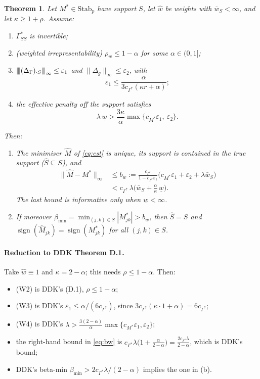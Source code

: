 \documentclass[11pt,a4paper]{article}
\numberwithin{equation}{section}
\theoremstyle{plain}
\newtheorem{theorem}{Theorem}
\theoremstyle{remark}
\newcommand{\opnorm}[1]{{\vert\kern-0.25ex\vert\kern-0.25ex\vert #1 \vert\kern-0.25ex\vert\kern-0.25ex\vert}}
\DeclareMathOperator{\sign}{sign}
\begin{document}
\begin{theorem}\label{thm:W1}
Let $M^*\in\mathrm{Stab}_p$ have support $S$, let $\hat w$ be weights with $\bar w_S<\infty$, and let $\kappa\ge1+\rho$. Assume:
\begin{enumerate}[label=\upshape(W\arabic*),leftmargin=3.2em]
  \item $\Gamma^*_{SS}$ is invertible;
  \item (weighted irrepresentability) $\rho_w\le1-\alpha$ for some $\alpha\in(0,1]$;
  \item $\opnorm{(\Delta_\Gamma)_{\cdot S}}_\infty\le\varepsilon_1$ and $\|\Delta_g\|_\infty\le\varepsilon_2$, with
  \[
  \varepsilon_1\le\frac{\alpha}{3c_{\Gamma^*}(\kappa r+\alpha)};
  \]
  \item the effective penalty off the support satisfies
  \[
  \lambda\,\underline w>\frac{3\kappa}{\alpha}\max\{c_{M^*}\varepsilon_1,\ \varepsilon_2\}.
  \]
\end{enumerate}
Then:
\begin{enumerate}[label=\upshape\textbf{(\alph*)},leftmargin=2.5em]
  \item The minimiser $\hat M$ of \eqref{eq:est} is unique, its support is contained in the true support ($\hat S\subseteq S$), and
  \begin{equation}\label{eq:bw}
  \begin{split}
  \|\hat M-M^*\|_\infty&\le b_w:=\frac{c_{\Gamma^*}}{1-c_{\Gamma^*}\varepsilon_1}\big(c_{M^*}\varepsilon_1+\varepsilon_2+\lambda\bar w_S\big)\\
  &<c_{\Gamma^*}\,\lambda\Big(\bar w_S+\frac{\alpha}{\kappa}\,\underline w\Big).
  \end{split}
  \end{equation}
  The last bound is informative only when $\underline w<\infty$.
  \item If moreover $\beta_{\min}=\min_{(j,k)\in S}|M^*_{jk}|>b_w$, then $\hat S=S$ and $\sign(\hat M_{jk})=\sign(M^*_{jk})$ for all $(j,k)\in S$.
\end{enumerate}
\end{theorem}

\paragraph{Reduction to DDK Theorem D.1.} Take $\hat w\equiv1$ and $\kappa=2-\alpha$; this needs $\rho\le1-\alpha$. Then:
\begin{itemize}
  \item (W2) is DDK's (D.1), $\rho\le1-\alpha$;
  \item (W3) is DDK's $\varepsilon_1\le\alpha/(6c_{\Gamma^*})$, since $3c_{\Gamma^*}(\kappa\cdot1+\alpha)=6c_{\Gamma^*}$;
  \item (W4) is DDK's $\lambda>\frac{3(2-\alpha)}{\alpha}\max\{c_{M^*}\varepsilon_1,\varepsilon_2\}$;
  \item the right-hand bound in \eqref{eq:bw} is $c_{\Gamma^*}\lambda\big(1+\frac{\alpha}{2-\alpha}\big)=\frac{2c_{\Gamma^*}\lambda}{2-\alpha}$, which is DDK's bound;
  \item DDK's beta-min $\beta_{\min}>2c_{\Gamma^*}\lambda/(2-\alpha)$ implies the one in (b).
\end{itemize}
\end{document}

